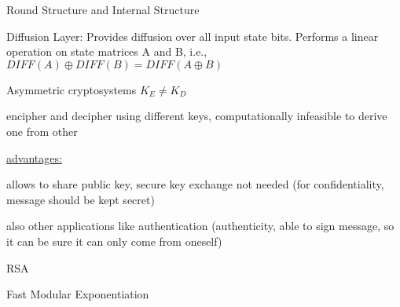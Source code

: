 \documentclass[landscape, a4paper]{article}
\begin{document}
\begin{minipage}[t]{0.19\pagewidth}
\begin{betterlist}
\begin{betterlist}
\begin{betterlist}
\begin{betterlist}
				\end{betterlist}
			\end{betterlist}
			\begin{betterlist}
				\item Round Structure and Internal Structure
				\begin{betterlist}
					\item \alert{Diffusion Layer:}  Provides diffusion over all input state bits. Performs a linear operation on state matrices A and B, i.e., $DIFF(A) \oplus DIFF(B) = DIFF(A \oplus B)$
				\end{betterlist}
			\end{betterlist}
		\end{betterlist}
	\end{betterlist}
	\begin{betterlist}
		\item \alert{Asymmetric cryptosystems} $K_E \ne K_D$
		\begin{betterlist}
      \item encipher and decipher using different keys, computationally infeasible to derive one from other
			\item \underline{advantages:}
			\begin{betterlist}
				\item allows to share public key, secure key exchange not needed (for \alert{confidentiality}, message should be kept secret)
				\item also other applications like authentication (\alert{authenticity}, able to sign message, so it can be sure it can only come from oneself)
			\end{betterlist}
		\end{betterlist}
	\end{betterlist}
	\begin{betterlist}
		\item RSA
		\begin{betterlist}
			\item Fast Modular Exponentiation
		\end{betterlist}
	\end{betterlist}
\end{minipage}
\end{document}
